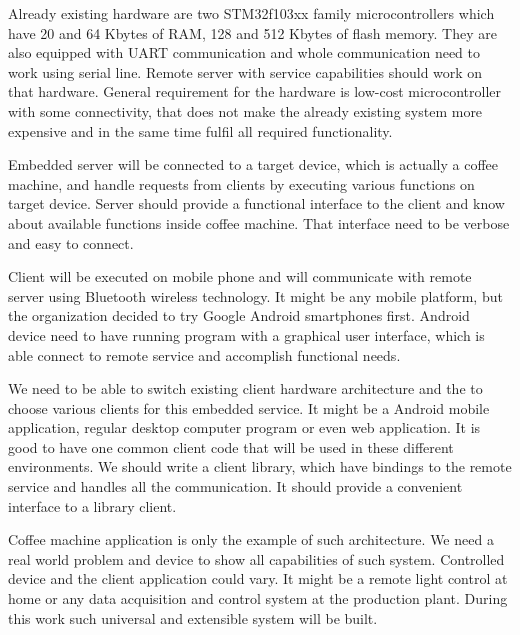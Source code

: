 Already existing hardware are two STM32f103xx family microcontrollers which have
20 and 64 Kbytes of \gls{RAM}, 128 and 512 Kbytes of flash memory. They are also
equipped with \gls{UART} communication and whole communication need to work using
serial line. Remote server with service capabilities should work on that
hardware. General requirement for the hardware is low-cost microcontroller with
some connectivity, that does not make the  already existing system more
expensive and in the same time fulfil all required functionality.

Embedded server will be connected to a target device, which is actually a coffee
machine, and handle requests from clients by executing various functions on
target device.
Server should provide a functional interface to the client and know about
available functions inside coffee machine. That interface need to be verbose and
easy to connect. 

Client will be executed on mobile phone and will communicate with remote server
using Bluetooth wireless technology. It might be any mobile platform, but
the organization decided to try Google Android smartphones first. 
Android device need to have running program with a graphical user interface,
which is able connect to remote service and accomplish functional needs.

We need to be able to switch existing client hardware architecture and the to
choose various clients for this embedded service. It might be a Android mobile
application, regular desktop computer program or even web application.
It is good to have one common client code that will be used in these different
environments. We should write a client library, which have bindings to the
remote service and handles all the communication. It should provide a
convenient interface to a library client.

Coffee machine application is only the example of such architecture.
We need a real world problem and device to show all capabilities of such system.
Controlled device and the client application could vary. It might be a
remote light control at home or any data acquisition and control system at the
production plant. During this work such universal and extensible system will be
built.

